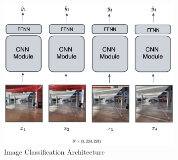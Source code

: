 \documentclass[a4paper]{article}
\begin{document}


  \begin{figure}[ht]
    \centering
    \begin{subfigure}[b]{0.42\linewidth}
      \centering
      \includegraphics[width=\linewidth]{figures/cnn-architecture.png}
      \caption{Image Classification Architecture}
      \label{fig:cnn-architecture}
    \end{subfigure}
    \hfill
    \begin{subfigure}[b]{0.42\linewidth}
      \centering

\end{subfigure}
\end{figure}
\end{document}
